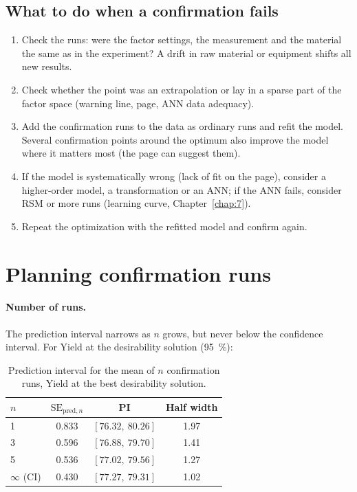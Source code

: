 \subsection{What to do when a confirmation fails}

\begin{enumerate}
  \item Check the runs: were the factor settings, the measurement and the material the same as in the experiment?
    A drift in raw material or equipment shifts all new results.
  \item Check whether the point was an extrapolation or lay in a sparse part of the factor space (warning line,
     page, ANN data adequacy).
  \item Add the confirmation runs to the data as ordinary runs and refit the model. Several confirmation points
    around the optimum also improve the model where it matters most (the  page can suggest them).
  \item If the model is systematically wrong (lack of fit on the  page), consider a higher-order
    model, a transformation or an ANN; if the ANN fails, consider RSM or more runs (learning curve, Chapter~\ref{chap:7}).
  \item Repeat the optimization with the refitted model and confirm again.
\end{enumerate}

\section{Planning confirmation runs}\label{sec:ch10-advice}

\paragraph{Number of runs.} The prediction interval narrows as $n$ grows, but never below the confidence interval.
For Yield at the desirability solution (95~\%):

\begin{table}[htbp]
\centering
\caption{Prediction interval for the mean of $n$ confirmation runs, Yield at the best desirability solution.}
\label{tab:ch10-n}
\begin{tabular}{@{}lccc@{}}
\toprule
$n$ & $\text{SE}_{\text{pred},n}$ & PI & Half width \\
\midrule
1 & 0.833 & $[76.32,\ 80.26]$ & 1.97 \\
3 & 0.596 & $[76.88,\ 79.70]$ & 1.41 \\
5 & 0.536 & $[77.02,\ 79.56]$ & 1.27 \\
$\infty$ (CI) & 0.430 & $[77.27,\ 79.31]$ & 1.02 \\
\bottomrule
\end{tabular}
\end{table}

